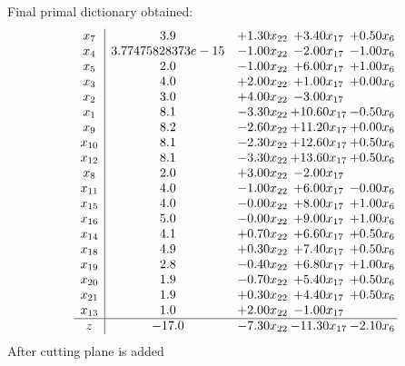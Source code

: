 \documentclass[8pt]{article}
\begin{document}
 Final primal dictionary obtained: 
\[\begin{array}{c| c c@{\hskip 2pt} c@{\hskip 2pt} c@{\hskip 2pt} }
 x_{7}   &  3.9 & +  1.30 x_{22} & +  3.40 x_{17} & +  0.50 x_{6}\\
 x_{4}   &  3.77475828373e-15 & -1.00 x_{22} & -2.00 x_{17} & -1.00 x_{6}\\
 x_{5}   &  2.0 & -1.00 x_{22} & +  6.00 x_{17} & +  1.00 x_{6}\\
 x_{3}   &  4.0 & +  2.00 x_{22} & +  1.00 x_{17} & +  0.00 x_{6}\\
 x_{2}   &  3.0 & +  4.00 x_{22} & -3.00 x_{17} &   \\
 x_{1}   &  8.1 & -3.30 x_{22} & + 10.60 x_{17} & -0.50 x_{6}\\
 x_{9}   &  8.2 & -2.60 x_{22} & + 11.20 x_{17} & +  0.00 x_{6}\\
 x_{10}   &  8.1 & -2.30 x_{22} & + 12.60 x_{17} & +  0.50 x_{6}\\
 x_{12}   &  8.1 & -3.30 x_{22} & + 13.60 x_{17} & +  0.50 x_{6}\\
 x_{8}   &  2.0 & +  3.00 x_{22} & -2.00 x_{17} &   \\
 x_{11}   &  4.0 & -1.00 x_{22} & +  6.00 x_{17} & -0.00 x_{6}\\
 x_{15}   &  4.0 & -0.00 x_{22} & +  8.00 x_{17} & +  1.00 x_{6}\\
 x_{16}   &  5.0 & -0.00 x_{22} & +  9.00 x_{17} & +  1.00 x_{6}\\
 x_{14}   &  4.1 & +  0.70 x_{22} & +  6.60 x_{17} & +  0.50 x_{6}\\
 x_{18}   &  4.9 & +  0.30 x_{22} & +  7.40 x_{17} & +  0.50 x_{6}\\
 x_{19}   &  2.8 & -0.40 x_{22} & +  6.80 x_{17} & +  1.00 x_{6}\\
 x_{20}   &  1.9 & -0.70 x_{22} & +  5.40 x_{17} & +  0.50 x_{6}\\
 x_{21}   &  1.9 & +  0.30 x_{22} & +  4.40 x_{17} & +  0.50 x_{6}\\
 x_{13}   &  1.0 & +  2.00 x_{22} & -1.00 x_{17} &   \\
\hline
z    &  -17.0 & -7.30 x_{22} & -11.30 x_{17} & -2.10 x_{6}\\
\end{array}\]
 After cutting plane is added 
\end{document}
